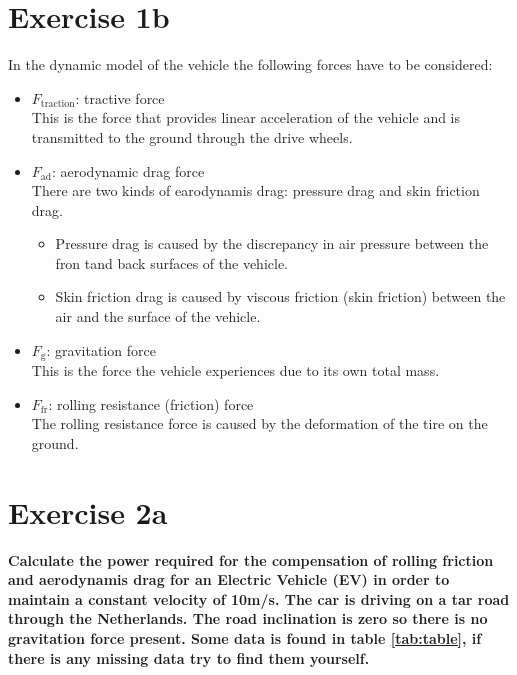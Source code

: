 \documentclass[final]{scrreprt} %
\begin{document}
\section{Exercise 1b}
In the dynamic model of the vehicle the following forces have to be considered: 
\begin{itemize}
\item $F_{\mathrm{traction}}$: tractive force \\
This is the force that provides linear acceleration of the vehicle and is transmitted to the ground through the drive wheels. 
\item $F_{\mathrm{ad}}$: aerodynamic drag force\\
There are two kinds of earodynamis drag: pressure drag and skin friction drag.
\begin{itemize}
\item Pressure drag is caused by the discrepancy in air pressure between the fron tand back surfaces of the vehicle.
\item Skin friction drag is caused by viscous friction (skin friction) between the air and the surface of the vehicle.
\end{itemize}
\item $F_\mathrm{g}$: gravitation force\\
This is the force the vehicle experiences due to its own total mass. 
\item $F_{\mathrm{fr}}$: rolling resistance (friction) force\\
The rolling resistance force is caused by the deformation of the tire on the ground.  
\end{itemize}

\section{Exercise 2a}
{\bf Calculate the power required for the compensation of rolling friction and aerodynamis drag for an Electric Vehicle (EV) in order to maintain a constant velocity of 10m/s. The car is driving on a tar road through the Netherlands. The road inclination is zero so there is no gravitation force present. Some data is found in table \ref{tab:table}, if there is any missing data try to find them yourself.} \\
\end{document}
